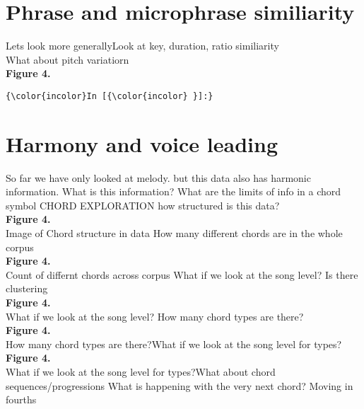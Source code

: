 \documentclass[11pt]{article}
\begin{document}
\section{Phrase and microphrase similiarity}

\noindent
Lets look more generallyLook at key, duration, ratio similiarity
\\

\noindent
What about pitch variatiorn
\\

\noindent
\textbf{Figure 4.}
\\
    \begin{Verbatim}[commandchars=\\\{\}]
{\color{incolor}In [{\color{incolor} }]:} 
\end{Verbatim}

\noindent
\section{Harmony and voice leading}

\noindent
So far we have only looked at melody. but this data also has harmonic information. What is this information? What are the limits of info in a chord symbol CHORD EXPLORATION how structured is this data?
\\

\noindent
\textbf{Figure 4.}
\\\vspace{5mm} 
\noindent
Image of Chord structure in data How many different chords are in the whole corpus
\\

\noindent
\textbf{Figure 4.}
\\\vspace{5mm} 
\noindent
Count of differnt chords across corpus What if we look at the song level? Is there clustering
\\

\noindent
\textbf{Figure 4.}
\\\vspace{5mm} 
\noindent
What if we look at the song level? How many chord types are there?
\\

\noindent
\textbf{Figure 4.}
\\\vspace{5mm} 
\noindent
How many chord types are there?What if we look at the song level for types?
\\

\noindent
\textbf{Figure 4.}
\\\vspace{5mm} 
\noindent
What if we look at the song level for types?What about chord sequences/progressions
What is happening with the very next chord? Moving in fourths
\\
\end{document}
